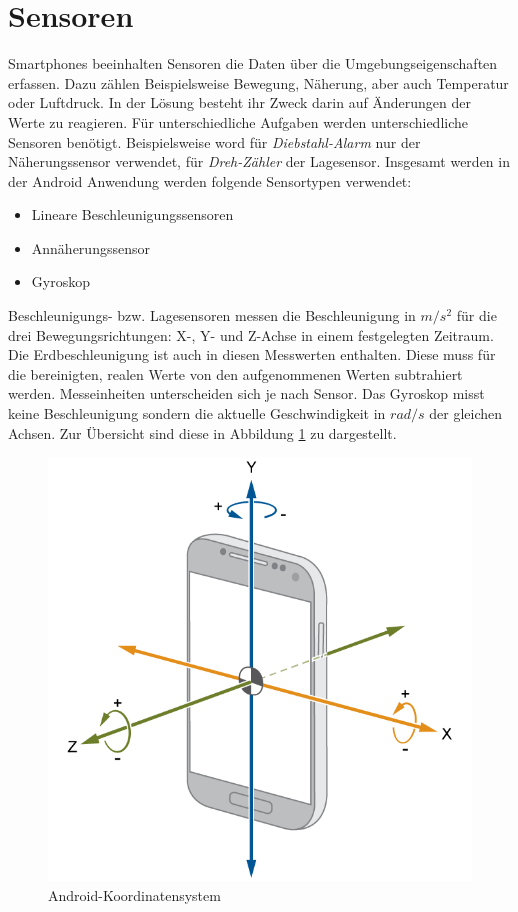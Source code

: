 \documentclass[11pt,a4paper]{report}
\begin{document}
\section{Sensoren}
Smartphones beeinhalten Sensoren die Daten über die Umgebungseigenschaften erfassen.
Dazu zählen Beispielsweise Bewegung, Näherung, aber auch Temperatur oder Luftdruck.
In der Lösung besteht ihr Zweck darin auf Änderungen der Werte zu reagieren.
Für unterschiedliche Aufgaben werden unterschiedliche Sensoren benötigt.
Beispielsweise word für \textit{Diebstahl-Alarm} nur der Näherungssensor verwendet, für \textit{Dreh-Zähler} der Lagesensor.
Insgesamt werden in der Android Anwendung werden folgende Sensortypen verwendet:
\begin{itemize}
  \item Lineare Beschleunigungssensoren
  \item Annäherungssensor
  \item Gyroskop
\end{itemize}
Beschleunigungs- bzw. Lagesensoren messen die Beschleunigung in $m/s^2$ für die drei Bewegungsrichtungen: X-, Y- und Z-Achse in einem festgelegten Zeitraum.
Die Erdbeschleunigung ist auch in diesen Messwerten enthalten.
Diese muss für die bereinigten, realen Werte von den aufgenommenen Werten subtrahiert werden\cite{accel_g}.
Messeinheiten unterscheiden sich je nach Sensor.
Das Gyroskop misst keine Beschleunigung sondern die aktuelle Geschwindigkeit in $rad/s$ der gleichen Achsen.
Zur Übersicht sind diese in Abbildung \ref{fig:and_axes} zu dargestellt.
\begin{figure}[htbp]
  \centering
  \includegraphics[width=.7\textwidth]{images/android_axes.png}
  \caption{Android-Koordinatensystem}
  \label{fig:and_axes}
\end{figure}
\end{document}
